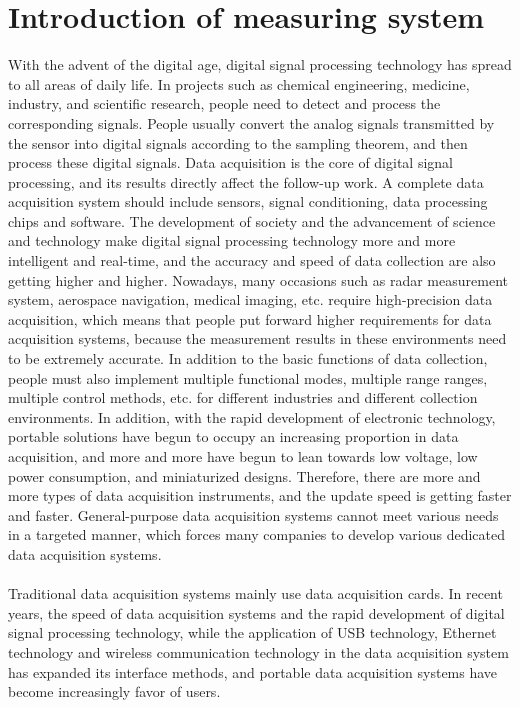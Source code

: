 \section{Introduction of measuring system}
\label{Introduction of measuring system}
With the advent of the digital age, digital signal processing technology has spread to all areas of daily life. In projects such as chemical engineering, medicine, industry, and scientific research, people need to detect and process the corresponding signals. People usually convert the analog signals transmitted by the sensor into digital signals according to the sampling theorem, and then process these digital signals. Data acquisition is the core of digital signal processing, and its results directly affect the follow-up work. A complete data acquisition system should include sensors, signal conditioning, data processing chips and software. The development of society and the advancement of science and technology make digital signal processing technology more and more intelligent and real-time, and the accuracy and speed of data collection are also getting higher and higher. Nowadays, many occasions such as radar measurement system, aerospace navigation, medical imaging, etc. require high-precision data acquisition, which means that people put forward higher requirements for data acquisition systems, because the measurement results in these environments need to be extremely accurate. In addition to the basic functions of data collection, people must also implement multiple functional modes, multiple range ranges, multiple control methods, etc. for different industries and different collection environments. In addition, with the rapid development of electronic technology, portable solutions have begun to occupy an increasing proportion in data acquisition, and more and more have begun to lean towards low voltage, low power consumption, and miniaturized designs. Therefore, there are more and more types of data acquisition instruments, and the update speed is getting faster and faster. General-purpose data acquisition systems cannot meet various needs in a targeted manner, which forces many companies to develop various dedicated data acquisition systems.
\\
\\
Traditional data acquisition systems mainly use data acquisition cards. In recent years, the speed of data acquisition systems and the rapid development of digital signal processing technology, while the application of USB technology, Ethernet technology and wireless communication technology in the data acquisition system has expanded its interface methods, and portable data acquisition systems have become increasingly favor of users.
